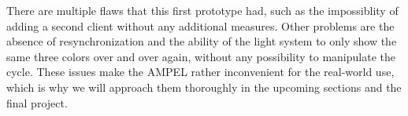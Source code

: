There are multiple flaws that this first prototype had, such as the impossiblity of adding a second client without any additional measures. 
Other problems are the absence of resynchronization and the ability of the light system to only show the same three colors over and over again, without any possibility to manipulate the cycle.
These issues make the AMPEL rather inconvenient for the real-world use, which is why we will approach them thoroughly in the upcoming sections and the final project. 

